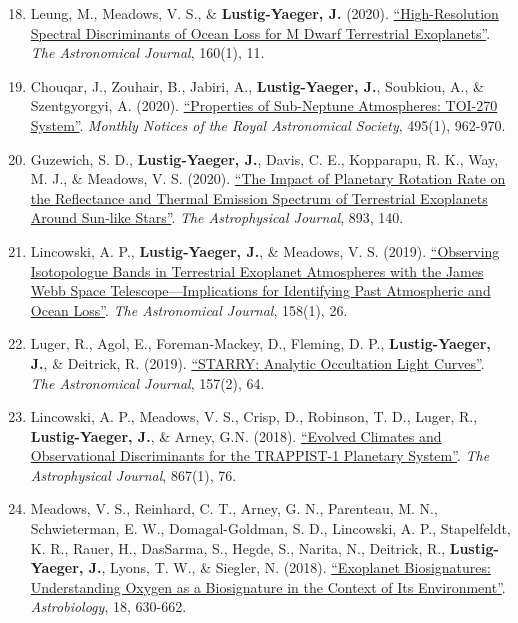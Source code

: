 \documentclass[margin,10pt]{res}
\newenvironment{benumerate}[1]{
    \let\oldItem\item
    \def\item{\addtocounter{enumi}{-2}\oldItem}
    \begin{enumerate}
    \setcounter{enumi}{#1}
    \addtocounter{enumi}{1}
}{
    \end{enumerate}
}
\begin{document}
\begin{resume}
\begin{benumerate}{17}
                    \item Leung, M., Meadows, V. S., \& \textbf{Lustig-Yaeger, J.} (2020). \href{https://ui.adsabs.harvard.edu/abs/2020arXiv200413731L/abstract}{``High-Resolution Spectral Discriminants of Ocean Loss for M Dwarf Terrestrial Exoplanets''}. \textit{The Astronomical Journal}, 160(1), 11. 
                    \item Chouqar, J., Zouhair, B., Jabiri, A., \textbf{Lustig-Yaeger, J.}, Soubkiou, A., \& Szentgyorgyi, A. (2020). \href{https://ui.adsabs.harvard.edu/abs/2020MNRAS.495..962C/abstract}{``Properties of Sub-Neptune Atmospheres: TOI-270 System''}. \textit{Monthly Notices of the Royal Astronomical Society}, 495(1), 962-970.
                    \item Guzewich, S. D., \textbf{Lustig-Yaeger, J.}, Davis, C. E., Kopparapu, R. K., Way, M. J., \& Meadows, V. S.  (2020). \href{https://ui.adsabs.harvard.edu/abs/2020arXiv200202549G/abstract}{``The Impact of Planetary Rotation Rate on the Reflectance and Thermal Emission Spectrum of Terrestrial Exoplanets Around Sun-like Stars''}. \textit{The Astrophysical Journal}, 893, 140. 
                    \item Lincowski, A. P., \textbf{Lustig-Yaeger, J.}, \& Meadows, V. S.  (2019). \href{https://doi.org/10.3847/1538-3881/ab2385}{``Observing Isotopologue Bands in Terrestrial Exoplanet Atmospheres with the James Webb Space Telescope---Implications for Identifying Past Atmospheric and Ocean Loss''}. \textit{The Astronomical Journal}, 158(1), 26.
                    \item Luger, R., Agol, E., Foreman-Mackey, D., Fleming, D. P., \textbf{Lustig-Yaeger, J.}, \& Deitrick, R. (2019).  \href{http://adsabs.harvard.edu/cgi-bin/bib_query?arXiv:1810.06559}{``STARRY: Analytic Occultation Light Curves''}. \textit{The Astronomical Journal}, 157(2), 64.
                    \item Lincowski, A. P., Meadows, V. S., Crisp, D., Robinson, T. D., Luger, R., \textbf{Lustig-Yaeger, J.}, \& Arney, G.N. (2018). \href{http://adsabs.harvard.edu/cgi-bin/bib_query?arXiv:1809.07498}{``Evolved Climates and Observational Discriminants for the TRAPPIST-1 Planetary System''}. \textit{The Astrophysical Journal}, 867(1), 76.
                    \item Meadows, V. S.,  Reinhard, C. T., Arney, G. N., Parenteau, M. N., Schwieterman, E. W., Domagal-Goldman, S. D., Lincowski, A. P., Stapelfeldt, K. R., Rauer, H., DasSarma, S., Hegde, S., Narita, N., Deitrick, R., \textbf{Lustig-Yaeger, J.}, Lyons, T. W., \& Siegler, N. (2018).  \href{http://adsabs.harvard.edu/abs/2018AsBio..18..630M}{``Exoplanet Biosignatures:  Understanding Oxygen as a Biosignature in the Context of Its Environment''}. \textit{Astrobiology}, 18, 630-662.

\end{benumerate}
\end{resume}
\end{document}
